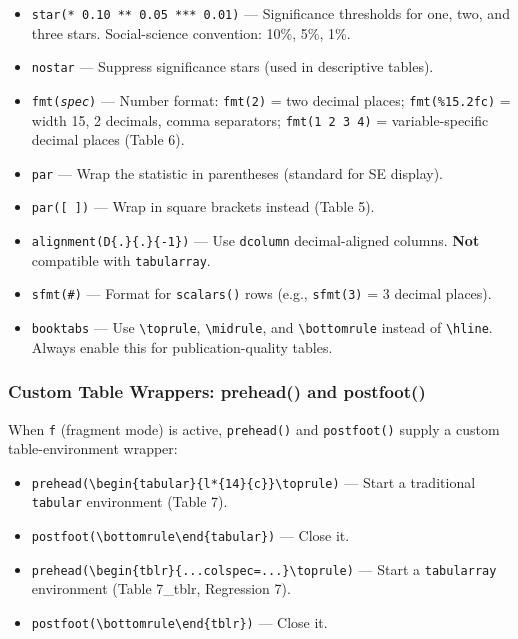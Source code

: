 \documentclass[11pt]{article}
\numberwithin{table}{section}
\begin{document}
\begin{itemize}
    \item \texttt{star(* 0.10 ** 0.05 *** 0.01)} --- Significance thresholds for one, two, and three stars. Social-science convention: 10\%, 5\%, 1\%.
    \item \texttt{nostar} --- Suppress significance stars (used in descriptive tables).
    \item \texttt{fmt(\emph{spec})} --- Number format: \texttt{fmt(2)} = two decimal places; \texttt{fmt(\%15.2fc)} = width 15, 2 decimals, comma separators; \texttt{fmt(1 2 3 4)} = variable-specific decimal places (Table 6).
    \item \texttt{par} --- Wrap the statistic in parentheses (standard for SE display).
    \item \texttt{par([ ])} --- Wrap in square brackets instead (Table 5).
    \item \texttt{alignment(D\{.\}\{.\}\{-1\})} --- Use \texttt{dcolumn} decimal-aligned columns. \textbf{Not} compatible with \texttt{tabularray}.
    \item \texttt{sfmt(\#)} --- Format for \texttt{scalars()} rows (e.g., \texttt{sfmt(3)} = 3 decimal places).
    \item \texttt{booktabs} --- Use \texttt{\textbackslash toprule}, \texttt{\textbackslash midrule}, and \texttt{\textbackslash bottomrule} instead of \texttt{\textbackslash hline}. Always enable this for publication-quality tables.
\end{itemize}

\subsubsection{Custom Table Wrappers: prehead() and postfoot()}

When \texttt{f} (fragment mode) is active, \texttt{prehead()} and \texttt{postfoot()} supply a custom table-environment wrapper:

\begin{itemize}
    \item \texttt{prehead(\textbackslash begin\{tabular\}\{l*\{14\}\{c\}\}\textbackslash toprule)} --- Start a traditional \texttt{tabular} environment (Table 7).
    \item \texttt{postfoot(\textbackslash bottomrule\textbackslash end\{tabular\})} --- Close it.
    \item \texttt{prehead(\textbackslash begin\{tblr\}\{...colspec=...\}\textbackslash toprule)} --- Start a \texttt{tabularray} environment (Table 7\_tblr, Regression 7).
    \item \texttt{postfoot(\textbackslash bottomrule\textbackslash end\{tblr\})} --- Close it.
\end{itemize}
\end{document}
